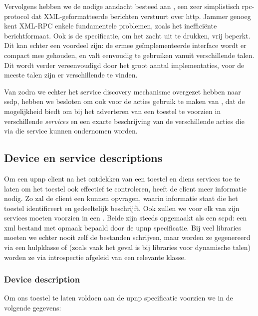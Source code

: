 Vervolgens hebben we de nodige aandacht besteed aan , een zeer simplistisch \ac{rpc}-protocol dat XML-geformatteerde berichten verstuurt over \ac{http}. Jammer genoeg kent XML-RPC enkele fundamentele problemen, zoals het inefficiënte berichtformaat. Ook is de specificatie, om het zacht uit te drukken, vrij beperkt. Dit kan echter een voordeel zijn: de ermee geïmplementeerde interface wordt er compact mee gehouden, en valt eenvoudig te gebruiken vanuit verschillende talen. Dit wordt verder vereenvoudigd door het groot aantal implementaties, voor de meeste talen zijn er verschillende te vinden.

Van zodra we echter het service discovery mechanisme overgezet hebben naar \ac{ssdp}, hebben we besloten om ook voor de acties gebruik te maken van , dat de mogelijkheid biedt om bij het adverteren van een toestel te voorzien in verschillende \emph{services} en een exacte beschrijving van de verschillende acties die via die service kunnen ondernomen worden.

\subsection{Device en service descriptions}

Om een \ac{upnp} client na het ontdekken van een toestel en diens services toe te laten om het toestel ook effectief te controleren, heeft de client meer informatie nodig. Zo zal de client een  kunnen opvragen, waarin informatie staat die het toestel identificeert en gedeeltelijk beschrijft. Ook zullen we voor elk van zijn services moeten voorzien in een . Beide zijn steeds opgemaakt als een \ac{scpd}: een \ac{xml} bestand met opmaak bepaald door de \ac{upnp} specificatie. Bij veel libraries moeten we echter nooit zelf de bestanden schrijven, maar worden ze gegenereerd via een hulpklasse of (zoals vaak het geval is bij libraries voor dynamische talen) worden ze via introspectie afgeleid van een relevante klasse.

\subsubsection{Device description}

Om ons toestel te laten voldoen aan de \ac{upnp} specificatie voorzien we in de volgende gegevens:

